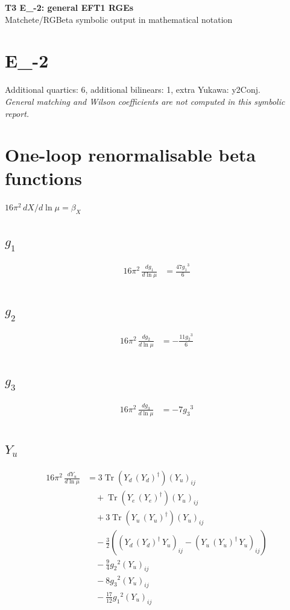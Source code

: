 \documentclass[10pt,a4paper]{article}
\begin{document}
\begin{center}
{\Large\bfseries T3 E\_-2: general EFT1 RGEs}\\[4pt]
Matchete/RGBeta symbolic output in mathematical notation
\end{center}
\bigskip
\section*{E\_-2}
Additional quartics: 6, additional bilinears: 1, extra Yukawa: y2Conj.\\
\emph{General matching and Wilson coefficients are not computed in this symbolic report.}
\clearpage
\section*{One-loop renormalisable beta functions}
$16\pi^2\,dX/d\ln\mu=\beta_X$
\subsection*{$g_1$}
\begin{align*}
16\pi^2\,\frac{d g_1}{d\ln\mu} &=\frac{47 {g_1}^3}{6} \\
\end{align*}
\subsection*{$g_2$}
\begin{align*}
16\pi^2\,\frac{d g_2}{d\ln\mu} &=-\frac{11 {g_2}^3}{6} \\
\end{align*}
\subsection*{$g_3$}
\begin{align*}
16\pi^2\,\frac{d g_3}{d\ln\mu} &=-7 {g_3}^3 \\
\end{align*}
\subsection*{$Y_u$}
\begin{align*}
16\pi^2\,\frac{d Y_u}{d\ln\mu} &=3 \operatorname{Tr}\!\left({Y_d}\,\left({Y_d}\right)^{\dagger}\right) \left({Y_u}\right)_{ij} \\
&\quad +\operatorname{Tr}\!\left({Y_e}\,\left({Y_e}\right)^{\dagger}\right) \left({Y_u}\right)_{ij} \\
&\quad +3 \operatorname{Tr}\!\left({Y_u}\,\left({Y_u}\right)^{\dagger}\right) \left({Y_u}\right)_{ij} \\
&\quad -\frac{3}{2} (\left({Y_d}\,\left({Y_d}\right)^{\dagger}\,{Y_u}\right)_{ij}-\left({Y_u}\,\left({Y_u}\right)^{\dagger}\,{Y_u}\right)_{ij}) \\
&\quad -\frac{9}{4} {g_2}^2 \left({Y_u}\right)_{ij} \\
&\quad -8 {g_3}^2 \left({Y_u}\right)_{ij} \\
&\quad -\frac{17}{12} {g_1}^2 \left({Y_u}\right)_{ij} \\
\end{align*}
\end{document}
